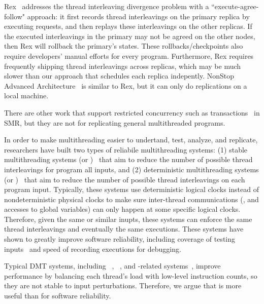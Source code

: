 Rex~\cite{rex:eurosys14} addresses the thread interleaving divergence problem
with a ``execute-agree-follow" approach: it first records thread interleavings
on the primary replica by executing requests, and then replays these
interleavings on the other replicas. If the executed interleavings in the
primary may not be agreed on the other nodes, then Rex will rollback the
primary's states. These rollbacks/checkpoints also require developers' manual
efforts for every program. Furthermore, Rex requires frequently shipping thread
interleavings across replicas, which may be much slower than our \smt approach
that schedules each replica indepently. NonStop Advanced
Architecture~\cite{nonstop:dsn05} is similar to Rex, but it can only do
replications on a local machine.

There are other work that support restricted concurrency such as
transactions~\cite{vandiver:sosp07, kobus:icdcs13} in SMR, but they are not for
replicating general multithreaded programs.

  In order to make multithreading easier to
undertand, test, analyze, and replicate, researchers have built two types of
reliabile multithreading systems: (1) stable multithreading systems (or
\smt)~\cite{grace:oopsla09, dthreads:sosp11, determinator:osdi10} that aim to
reduce the number of possible thread interleavings for program all inputs, and
(2) deterministic multithreading systems (or \dmt)~\cite{dpj:oopsla09,
dmp:asplos09, kendo:asplos09, coredet:asplos10, dos:osdi10, ddos:asplos13,
ics:oopsla13} that aim to reduce the number of possible thread interleavings on
each program input. Typically, these systems use deterministic logical clocks
instead of nondeterministic physical clocks to make sure inter-thread
communications (\eg, \mutexlock and accesses to global variables) can only
happen at some specific logical clocks. Therefore, given the same or similar
inupts, these systems can enforce the same thread interleavings and eventually
the same executions. These systems 
have shown to greatly improve software reliability, including coverage of
testing inputs~\cite{ics:oopsla13} and speed of recording
executions\cite{dos:osdi10} for debugging.

Typical DMT systems, including \kendo~\cite{kendo:asplos09},
\coredet~\cite{coredet:asplos10}, and \coredet-related systems~\cite{dos:osdi10,
ddos:asplos13}, improve performance by balancing each thread's load with
low-level instruction counts, so they are not stable to input perturbations.
Therefore, we argue that \smt is more useful than \dmt for software reliability.

